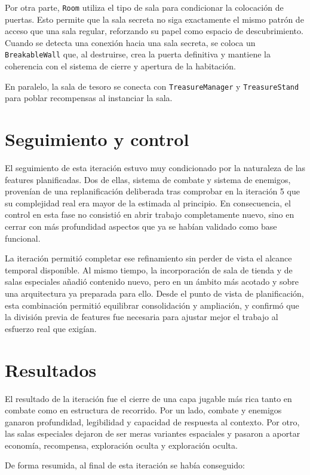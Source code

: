 Por otra parte, \texttt{Room} utiliza el tipo de sala para condicionar la colocación de
puertas. Esto permite que la sala secreta no siga exactamente el mismo patrón de acceso que
una sala regular, reforzando su papel como espacio de descubrimiento. Cuando se detecta una
conexión hacia una sala secreta, se coloca un \texttt{BreakableWall} que, al destruirse,
crea la puerta definitiva y mantiene la coherencia con el sistema de cierre y apertura de la
habitación.

En paralelo, la sala de tesoro se conecta con \texttt{TreasureManager} y
\texttt{TreasureStand} para poblar recompensas al instanciar la sala.

\section{Seguimiento y control}
El seguimiento de esta iteración estuvo muy condicionado por la naturaleza de las features
planificadas. Dos de ellas, sistema de combate y sistema de enemigos, provenían de una
replanificación deliberada tras comprobar en la iteración 5 que su complejidad real era mayor
de la estimada al principio. En consecuencia, el control en esta fase no consistió en abrir
trabajo completamente nuevo, sino en cerrar con más profundidad aspectos que ya se habían
validado como base funcional.

La iteración permitió completar ese refinamiento sin perder de vista el alcance temporal
disponible. Al mismo tiempo, la incorporación de sala de tienda y de salas especiales añadió
contenido nuevo, pero en un ámbito más acotado y sobre una arquitectura ya preparada para ello.
Desde el punto de vista de planificación, esta combinación permitió equilibrar consolidación y
ampliación, y confirmó que la división previa de features fue necesaria para ajustar mejor el
trabajo al esfuerzo real que exigían.

\section{Resultados}
El resultado de la iteración fue el cierre de una capa jugable más rica tanto en combate como
en estructura de recorrido. Por un lado, combate y enemigos ganaron profundidad, legibilidad
y capacidad de respuesta al contexto. Por otro, las salas especiales dejaron de ser meras
variantes espaciales y pasaron a aportar economía, recompensa, exploración oculta y
exploración oculta.

De forma resumida, al final de esta iteración se había conseguido:

